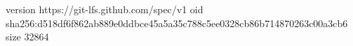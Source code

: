 version https://git-lfs.github.com/spec/v1
oid sha256:d518df6f862ab889e0ddbce45a5a35c788c5ee0328cb86b714870263c00a3cb6
size 32864
